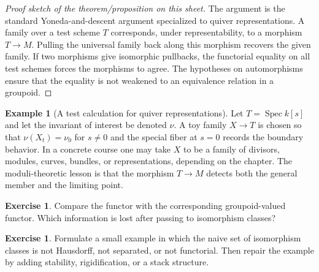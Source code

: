 \documentclass[11pt]{amsart}
\theoremstyle{definition}
\newtheorem{example}[theorem]{Example}
\newtheorem{exercise}[theorem]{Exercise}
\newcommand{\Spec}{\operatorname{Spec}}
\begin{document}
\begin{proof}[Proof sketch of the theorem/proposition on this sheet]
The argument is the standard Yoneda-and-descent argument specialized to quiver representations.  A family over a test scheme $T$ corresponds, under representability, to a morphism $T\to M$.  Pulling the universal family back along this morphism recovers the given family.  If two morphisms give isomorphic pullbacks, the functorial equality on all test schemes forces the morphisms to agree.  The hypotheses on automorphisms ensure that the equality is not weakened to an equivalence relation in a groupoid.
\end{proof}
\begin{example}[A test calculation for quiver representations]
Let $T=\Spec k[s]$ and let the invariant of interest be denoted $\nu$.  A toy family $X\to T$ is chosen so that $\nu(X_t)=\nu_0$ for $s\ne0$ and the special fiber at $s=0$ records the boundary behavior.  In a concrete course one may take $X$ to be a family of divisors, modules, curves, bundles, or representations, depending on the chapter.  The moduli-theoretic lesson is that the morphism $T\to M$ detects both the general member and the limiting point.
\end{example}
\begin{exercise}
Compare the functor with the corresponding groupoid-valued functor.  Which information is lost after passing to isomorphism classes?
\end{exercise}
\begin{exercise}
Formulate a small example in which the naive set of isomorphism classes is not Hausdorff, not separated, or not functorial.  Then repair the example by adding stability, rigidification, or a stack structure.
\end{exercise}
\clearpage
\end{document}
